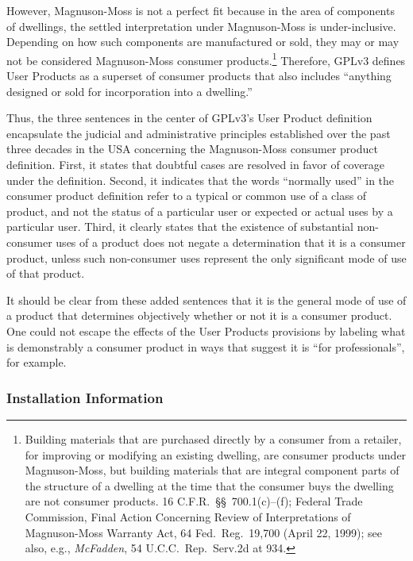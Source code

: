 However, Magnuson-Moss is not a perfect fit because in the area of components
of dwellings, the settled interpretation under Magnuson-Moss is under-inclusive.
Depending on how such components are manufactured or sold, they may or may
not be considered Magnuson-Moss consumer products.\footnote{Building
  materials that are purchased directly by a consumer from a retailer, for
  improving or modifying an existing dwelling, are consumer products under
  Magnuson-Moss, but building materials that are integral component parts of
  the structure of a dwelling at the time that the consumer buys the dwelling
  are not consumer products. 16 C.F.R.~\S\S~700.1(c)--(f); Federal Trade
  Commission, Final Action Concerning Review of Interpretations of
  Magnuson-Moss Warranty Act, 64 Fed.~Reg.~19,700 (April 22, 1999); see also,
  e.g., \textit{McFadden}, 54 U.C.C.~Rep.~Serv.2d at 934.}  Therefore, GPLv3
defines User Products as a superset of consumer products that also includes
``anything designed or sold for incorporation into a dwelling.''

Thus, the three sentences in the center of GPLv3's User Product definition
encapsulate the judicial and administrative principles established over the
past three decades in the USA concerning the Magnuson-Moss consumer product
definition.  First, it states that doubtful cases are resolved in favor of
coverage under the definition.  Second, it indicates that the words ``normally
used'' in the consumer product definition refer to a typical or common use of
a class of product, and not the status of a particular user or expected or
actual uses by a particular user.  Third, it clearly states that the
existence of substantial non-consumer uses of a product does not negate a
determination that it is a consumer product, unless such non-consumer uses
represent the only significant mode of use of that product.

It should be clear from these added sentences that it is the general mode of
use of a product that determines objectively whether or not it is a consumer
product.  One could not escape the effects of the User Products provisions by
labeling what is demonstrably a consumer product in ways that suggest it is
``for professionals'', for example.


\subsubsection{Installation Information}

\label{GPLv3-installation-information}

